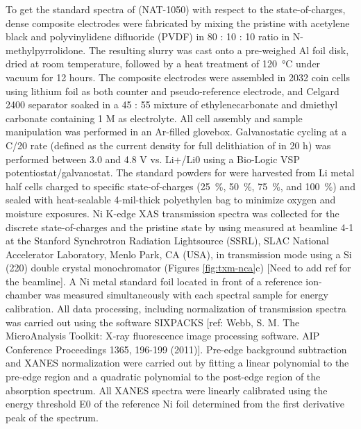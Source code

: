 \documentclass{article}
\begin{document}
To get the standard spectra of \nca{} (NAT-1050) with respect to the state-of-charges, dense composite electrodes were fabricated by mixing the pristine \nca{} with acetylene black and polyvinylidene difluoride (PVDF) in 80 : 10 : 10 ratio in N-methylpyrrolidone. The resulting slurry was cast onto a pre-weighed Al foil disk, dried at room temperature, followed by a heat treatment of \SI{120}{\celsius} under vacuum for 12 hours. The composite electrodes were assembled in 2032 coin cells using lithium foil as both counter and pseudo-reference electrode, and Celgard 2400 separator soaked in a 45 : 55 mixture of ethylenecarbonate and dmiethyl carbonate containing 1 M  as electrolyte. All cell assembly and sample manipulation was performed in an Ar-filled glovebox. Galvanostatic cycling at a C/20 rate (defined as the current density for full delithiation of \nca{} in 20 h) was performed between 3.0 and 4.8 V vs. Li+/Li0 using a Bio-Logic VSP potentiostat/galvanostat. The standard powders for \nca{} were harvested from Li metal half cells charged to specific state-of-charges (\SI{25}{\percent}, \SI{50}{\percent}, \SI{75}{\percent}, and \SI{100}{\percent}) and sealed with heat-sealable 4-mil-thick polyethylen bag to minimize oxygen and moisture exposures. Ni K-edge XAS transmission spectra was collected for the discrete state-of-charges and the pristine state by using measured at beamline 4-1 at the Stanford Synchrotron Radiation Lightsource (SSRL), SLAC National Accelerator Laboratory, Menlo Park, CA (USA), in transmission mode using a Si (220) double crystal monochromator (Figures \ref{fig:txm-nca}c) [Need to add ref for the beamline]. A Ni metal standard foil located in front of a reference ion-chamber was measured simultaneously with each spectral sample for energy calibration. All data processing, including normalization of transmission spectra was carried out using the software SIXPACKS [ref: Webb, S. M. The MicroAnalysis Toolkit: X‐ray fluorescence image processing software. AIP Conference Proceedings 1365, 196-199 (2011)]. Pre-edge background subtraction and XANES normalization were carried out by fitting a linear polynomial to the pre-edge region and a quadratic polynomial to the post-edge region of the absorption spectrum. All XANES spectra were linearly calibrated using the energy threshold E0 of the reference Ni foil determined from the first derivative peak of the spectrum.
\end{document}
